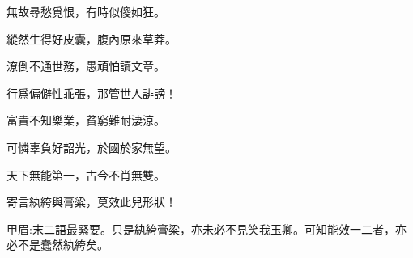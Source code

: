 \begin{poem}
    \begin{pl}無故尋愁覓恨，有時似傻如狂。\end{pl}
    \begin{pl}縱然生得好皮囊，腹內原來草莽。\end{pl}

    \begin{pl}潦倒不通世務，愚頑怕讀文章。\end{pl}
    \begin{pl}行爲偏僻性乖張，那管世人誹謗！\end{pl}

    \begin{pl}富貴不知樂業，貧窮難耐淒涼。\end{pl}
    \begin{pl}可憐辜負好韶光，於國於家無望。\end{pl}

    \begin{pl}天下無能第一，古今不肖無雙。\end{pl}
    \begin{pl}寄言紈絝與膏粱，莫效此兒形狀！\end{pl}
    \begin{note}甲眉:末二語最緊要。只是紈絝膏粱，亦未必不見笑我玉卿。可知能效一二者，亦必不是蠢然紈絝矣。\end{note}
\end{poem}


